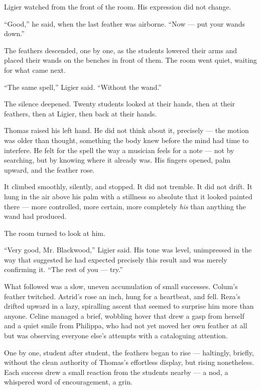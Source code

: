 Ligier watched from the front of the room. His expression did not change.
 
\enquote{Good,} he said, when the last feather was airborne. \enquote{Now --- put your wands down.}
 
The feathers descended, one by one, as the students lowered their arms and placed their wands on the benches in front of them. The room went quiet, waiting for what came next. 
 
\enquote{The same spell,} Ligier said. \enquote{Without the wand.}
 
The silence deepened. Twenty students looked at their hands, then at their feathers, then at Ligier, then back at their hands.
 
Thomas raised his left hand. He did not think about it, precisely --- the motion was older than thought, something the body knew before the mind had time to interfere. He felt for the spell the way a musician feels for a note --- not by searching, but by knowing where it already was. His fingers opened, palm upward, and the feather rose.
 
It climbed smoothly, silently, and stopped. It did not tremble. It did not drift. It hung in the air above his palm with a stillness so absolute that it looked painted there --- more controlled, more certain, more completely \textit{his} than anything the wand had produced.
 
The room turned to look at him.
 
\enquote{Very good, Mr. Blackwood,} Ligier said. His tone was level, unimpressed in the way that suggested he had expected precisely this result and was merely confirming it. \enquote{The rest of you --- try.}
 
What followed was a slow, uneven accumulation of small successes. Colum's feather twitched. Astrid's rose an inch, hung for a heartbeat, and fell. Reza's drifted upward in a lazy, spiralling ascent that seemed to surprise him more than anyone. Celine managed a brief, wobbling hover that drew a gasp from herself and a quiet smile from Philippa, who had not yet moved her own feather at all but was observing everyone else's attempts with a cataloguing attention.
 
One by one, student after student, the feathers began to rise --- haltingly, briefly, without the clean authority of Thomas's effortless display, but rising nonetheless. Each success drew a small reaction from the students nearby --- a nod, a whispered word of encouragement, a grin.
 
